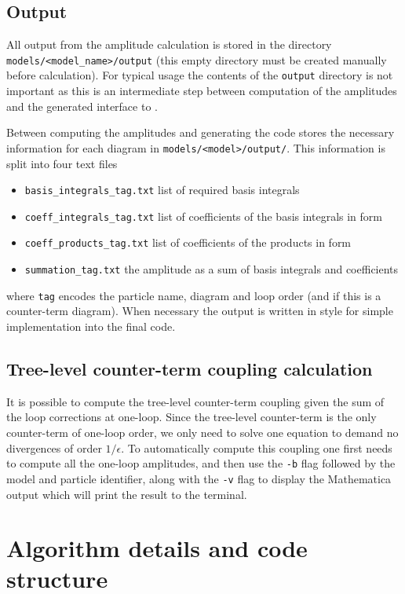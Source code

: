 \subsection{Output}

All output from the amplitude calculation is stored in the directory \lstinline{models/<model_name>/output} (this empty directory must be created manually before calculation).  For typical usage the contents of the \lstinline{output} directory is not important as this is an intermediate step between computation of the amplitudes and the generated \CC interface to \tsils.

Between computing the amplitudes and generating the code \mb stores the necessary information for each diagram in \lstinline{models/<model>/output/}.  This information is split into four text files
\begin{itemize}
\item \lstinline{basis_integrals_tag.txt} list of required basis integrals
\item \lstinline{coeff_integrals_tag.txt} list of coefficients of the basis integrals in \CC form
\item \lstinline{coeff_products_tag.txt} list of coefficients of the products in \CC form
\item \lstinline{summation_tag.txt} the amplitude as a sum of basis integrals and coefficients
\end{itemize}
where \lstinline{tag} encodes the particle name, diagram and loop order (and if this is a counter-term diagram).  When necessary the output is written in \CC style for simple implementation into the final code.

\subsection{Tree-level counter-term coupling calculation}\label{sec:ct}

It is possible to compute the tree-level counter-term coupling given the sum of the loop corrections at one-loop.  Since the tree-level counter-term is the only counter-term of one-loop order, we only need to solve one equation to demand no divergences of order $1/\epsilon$.  To automatically compute this coupling one first needs to compute all the one-loop amplitudes, and then use the \lstinline{-b} flag followed by the model and particle identifier, along with the \lstinline{-v} flag to display the Mathematica output which will print the result to the terminal.


\section{Algorithm details and code structure}

